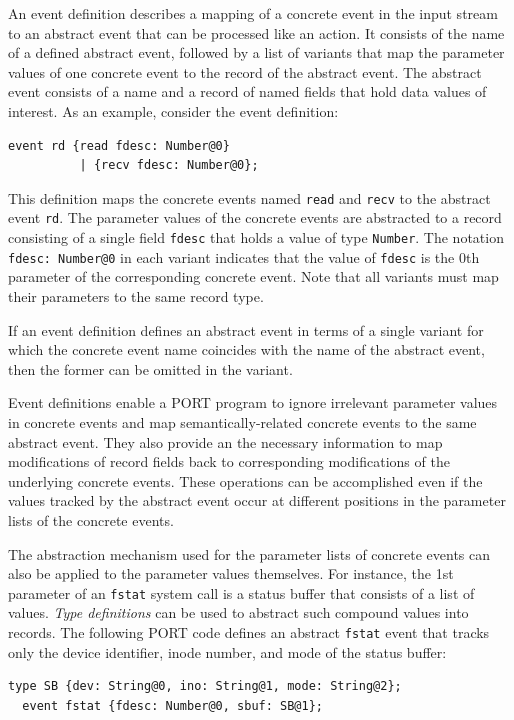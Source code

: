 An event definition describes a mapping of a concrete event in the input stream to an abstract event that can be processed like an action. It consists of the name of a defined abstract event, followed by a list of variants that map the parameter values of one concrete event to the record of the abstract event. The abstract event consists of a name and a record of named fields that hold data values of interest. As an example, consider the event definition:
\begin{lstlisting}[numbers=none,xleftmargin=0em,gobble=2,columns=strict]
  event rd {read fdesc: Number@0}
          | {recv fdesc: Number@0};
\end{lstlisting}
This definition maps the concrete events named \lstinline+read+ and \lstinline+recv+ to the abstract event \lstinline+rd+. The parameter values of the concrete events are abstracted to a record consisting of a single field \lstinline+fdesc+ that holds a value of type \lstinline+Number+. The notation \lstinline+fdesc: Number@0+ in each variant indicates that the value of \lstinline+fdesc+ is the 0th parameter of the corresponding concrete event. Note that all variants must map their parameters to the same record type.

If an event definition defines an abstract event in terms of a single variant for which the concrete event name coincides with the name of the abstract event, then the former can be omitted in the variant.

Event definitions enable a PORT program to ignore
irrelevant parameter values in concrete events and map semantically-related concrete events to the same abstract event.
They also provide an the necessary information to map modifications of record fields back to corresponding modifications of the underlying concrete events.
These operations can be accomplished even if the values tracked by the
abstract event occur at different positions in the parameter lists of the concrete events.

The abstraction mechanism used for the parameter lists of concrete events can also be applied to the parameter values themselves. For instance, the 1st parameter of an \lstinline+fstat+ system call is a status buffer that consists of a list of values. \emph{Type definitions} can be used to abstract such compound values into records. The following PORT code defines an abstract \lstinline+fstat+ event that tracks only the device identifier, inode number, and mode of the status buffer:
\begin{lstlisting}[numbers=none,xleftmargin=0em,gobble=2]
  type SB {dev: String@0, ino: String@1, mode: String@2};
  event fstat {fdesc: Number@0, sbuf: SB@1};
\end{lstlisting}

